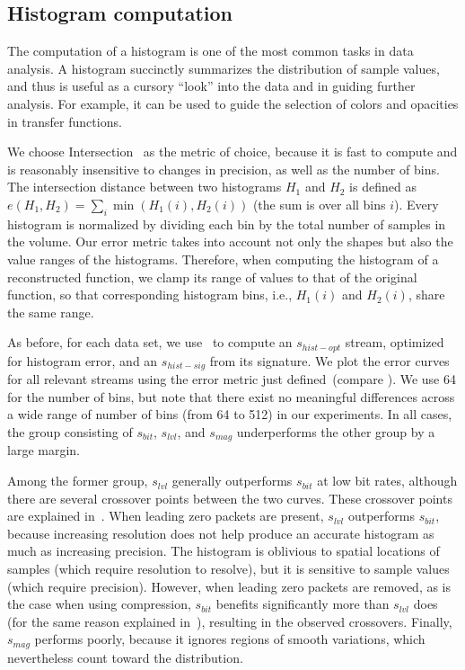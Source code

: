 \subsection{Histogram computation}\label{sec:histogram}

The computation of a histogram is one of the most common tasks in data analysis. A histogram
succinctly summarizes the distribution of sample values, and thus is useful as a cursory ``look''
into the data and in guiding further analysis. For example, it can be used to guide the selection of
colors and opacities in transfer functions.

We choose Intersection~\cite{histogram_intersection1991} as the metric of choice, because it is fast
to compute and is reasonably insensitive to changes in precision, as well as the number of bins. The
intersection distance between two histograms $H_1$ and $H_2$ is defined as
$e(H_1,H_2)=\sum_{i}{\min{(H_1(i),H_2(i))}}$ (the sum is over all bins $i$). Every histogram is
normalized by dividing each bin by the total number of samples in the volume. Our error metric takes
into account not only the shapes but also the value ranges of the histograms. Therefore, when
computing the histogram of a reconstructed function, we clamp its range of values to that of the
original function, so that corresponding histogram bins, i.e., $H_1(i)$ and $H_2(i)$, share the same
range.

As before, for each data set, we use~ to compute an $s_{hist-opt}$ stream,
optimized for histogram error, and an $s_{hist-sig}$ from its signature. We plot the error curves
for all relevant streams using the error metric just defined~(compare
). We use 64 for the number of bins, but note that there exist
no meaningful differences across a wide range of number of bins (from 64 to 512) in our experiments.
In all cases, the group consisting of $s_{bit}$, $s_{lvl}$, and $s_{mag}$ underperforms the other
group by a large margin.

Among the former group, $s_{lvl}$ generally outperforms $s_{bit}$ at low bit rates, although there
are several crossover points between the two curves. These crossover points are explained
in~. When leading zero packets are present, $s_{lvl}$ outperforms
$s_{bit}$, because increasing resolution does not help produce an accurate histogram as much as
increasing precision. The histogram is oblivious to spatial locations of samples (which require
resolution to resolve), but it is sensitive to sample values (which require precision). However,
when leading zero packets are removed, as is the case when using compression, $s_{bit}$ benefits
significantly more than $s_{lvl}$ does (for the same reason explained in~),
resulting in the observed crossovers. Finally, $s_{mag}$ performs poorly, because it ignores regions
of smooth variations, which nevertheless count toward the distribution.

